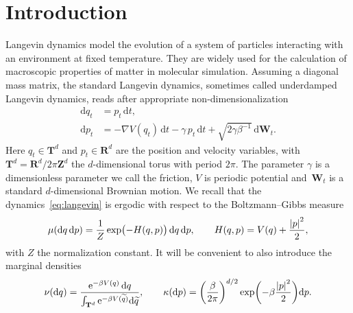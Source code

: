 \documentclass[11pt,a4paper]{article}
\newcommand{\e}{\mathrm{e}}
\newcommand{\real}{\mathbf R}
\newcommand{\integer}{\mathbf Z}
\newcommand{\torus}{\mathbf T}
\newcommand{\grad}{\nabla}
\newcommand{\vect}[1]{\boldsymbol{\mathbf #1}}
\renewcommand{\d}{\mathrm d}
\theoremstyle{plain}
\numberwithin{equation}{section}
\begin{document}
\section{Introduction}%
Langevin dynamics model the evolution of a system of particles interacting with an environment at fixed temperature.
They are widely used for the calculation of macroscopic properties of matter in molecular simulation.
Assuming a diagonal mass matrix,
the standard Langevin dynamics, sometimes called underdamped Langevin dynamics,
reads after appropriate non-dimensionalization~\cite[Section 2.2.4]{MR2681239}
\begin{subequations}
\label{eq:langevin}
\begin{align}
    \label{eq:langevin_q}
    \d q_t &= p_t \, \d t, \\
    \label{eq:langevin_p}
    \d p_t &= - \grad V(q_t) \, \d t - \gamma \, p_t \, \d t + \sqrt{2 \gamma \beta^{-1}} \, \d \vect W_t.
\end{align}
\end{subequations}
Here $q_t \in \torus^d$ and $p_t \in \real^d$ are the position and velocity variables,
with~$\torus^d = \real^d / 2\pi \integer^d$ the $d$-dimensional torus with period $2 \pi$.
The parameter $\gamma$ is a dimensionless parameter we call the friction,
$V$ is periodic potential
and~$\vect W_t$ is a standard $d$-dimensional Brownian motion.
We recall that the dynamics~\eqref{eq:langevin} is ergodic with respect to the Boltzmann--Gibbs measure
\begin{equation}
    \label{eq:invariant_measure}
    \mu(\d q \, \d p) = \frac{1}{Z} \exp \bigl( - H(q, p)  \bigr) \, \d q \, \d p,
    \qquad H(q, p) = V(q) + \frac{\abs{p}^2}{2},
\end{equation}
with $Z$ the normalization constant.
It will be convenient to also introduce the marginal densities
\begin{equation}
    \label{eq:definition_prob_measures}
    \nu(\d q) = \frac{\e^{- \beta V(q)} \, \d q}{\int_{\torus^d}\e^{-\beta V(\widetilde q)} \d \widetilde q},
    \qquad \kappa(\d p) = \left( \frac{\beta}{2 \pi} \right)^{d/2}\exp \biggl( - \beta \frac{\abs*{p}^2}{2} \biggr) \d p.
\end{equation}
\end{document}
